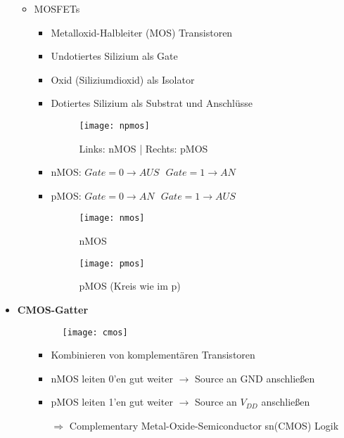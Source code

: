 \begin{itemize}
\begin{itemize}
	\item MOSFETs
		\begin{itemize}
		\item Metalloxid-Halbleiter (MOS) Transistoren
		\item Undotiertes Silizium als Gate
		\item Oxid (Siliziumdioxid) als Isolator
		\item Dotiertes Silizium als Substrat und Anschlüsse
		\item[] \begin{figure}[H]
				\begin{center}
				\texttt{[image: npmos]}
				\caption{Links: nMOS | Rechts: pMOS}
				\end{center}
				\end{figure}
		\item nMOS: $Gate = 0 \rightarrow AUS ~~~ Gate = 1 \rightarrow AN$
		\item pMOS: $Gate = 0 \rightarrow AN ~~~ Gate = 1 \rightarrow AUS$
		\item[]
			\begin{minipage}{0.3\textwidth}
				\begin{figure}[H]
				\texttt{[image: nmos]}
				\caption{nMOS}
				\end{figure}
			\end{minipage}
			\begin{minipage}[t]{0.4\textwidth}
				\begin{figure}[H]
				\vspace{-2.75cm}
				\texttt{[image: pmos]}
				\caption{pMOS (Kreis wie im p)}
				\end{figure}
			\end{minipage}
		\end{itemize}
	\end{itemize}


\item \textbf{CMOS-Gatter}
	\begin{itemize}
		\item[]		
			\begin{minipage}{0.3\textwidth}
				\begin{figure}[H]
				\texttt{[image: cmos]}
				\end{figure}
			\end{minipage}
			\begin{minipage}[t]{0.7\textwidth}
				\vspace{-1.25cm}
				\begin{itemize}
				\item Kombinieren von komplementären Transistoren
				\item nMOS leiten 0'en gut weiter $\rightarrow$ Source an GND anschließen
				\item pMOS leiten 1'en gut weiter $\rightarrow$ Source an $V_{DD}$ anschließen
				\item[$\Rightarrow$] Complementary Metal-Oxide-Semiconductor sn(CMOS) Logik
				\end{itemize}
			\end{minipage}	
		

\end{itemize}
\end{itemize}
